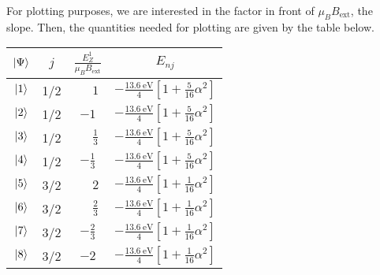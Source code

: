 \documentclass[a4paper, 12pt]{config/homework}
\begin{document}
\begin{enumerate}
\pagebreak
For plotting purposes, we are interested in the factor in front of \(\mu_B B_\text{ext}\), the slope. Then, the quantities needed for plotting are given by the table below.
\begin{table}[h]
\centering
\begin{tabular}{c|ccc}
\(\ket*{\Psi}\) & \(j\) & \(\frac{E_Z^1}{\mu_B B_\text{ext}}\) & \(E_{nj}\)                                                        \\ \hline
\(\ket*{1}\) & 1/2 & \(\phantom{-}1\) & \(-\frac{\qty{13.6}{\eV}}{4}\left[1+\frac{5}{16}\alpha^2\right]\) \\
\(\ket*{2}\) & 1/2 & \(-1\) & \(-\frac{\qty{13.6}{\eV}}{4}\left[1+\frac{5}{16}\alpha^2\right]\) \\
\(\ket*{3}\) & 1/2 & \(\phantom{-}\frac{1}{3}\) & \(-\frac{\qty{13.6}{\eV}}{4}\left[1+\frac{5}{16}\alpha^2\right]\) \\
\(\ket*{4}\) & 1/2 & \(-\frac{1}{3}\) & \(-\frac{\qty{13.6}{\eV}}{4}\left[1+\frac{5}{16}\alpha^2\right]\) \\
\(\ket*{5}\) & 3/2 & \(\phantom{-}2\) & \(-\frac{\qty{13.6}{\eV}}{4}\left[1+\frac{1}{16}\alpha^2\right]\) \\
\(\ket*{6}\) & 3/2 & \(\phantom{-}\frac{2}{3}\) & \(-\frac{\qty{13.6}{\eV}}{4}\left[1+\frac{1}{16}\alpha^2\right]\) \\
\(\ket*{7}\) & 3/2 & \(-\frac{2}{3}\) & \(-\frac{\qty{13.6}{\eV}}{4}\left[1+\frac{1}{16}\alpha^2\right]\) \\
\(\ket*{8}\) & 3/2 & \(-2\) & \(-\frac{\qty{13.6}{\eV}}{4}\left[1+\frac{1}{16}\alpha^2\right]\)
\end{tabular}
\end{table}

\end{enumerate}
\end{document}
